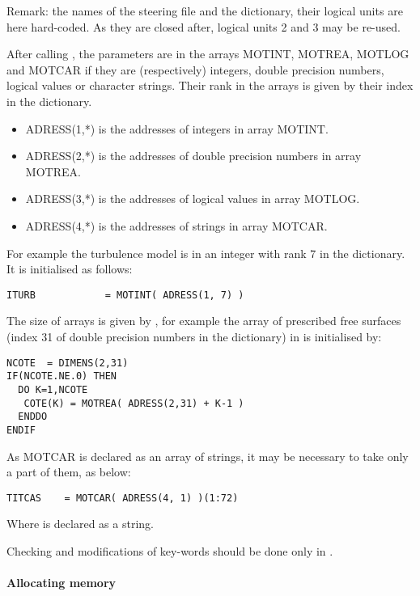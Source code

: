Remark: the names of the steering file and the dictionary, their logical units
are here hard-coded. As they are closed after, logical units 2 and 3 may be
re-used.

After calling , the parameters are in the arrays MOTINT,
MOTREA, MOTLOG and MOTCAR if they are (respectively) integers, double precision
numbers, logical values or character strings. Their rank in the arrays is given
by their index in the dictionary.

\begin{itemize}
  \item ADRESS(1,*) is the addresses of integers in array MOTINT.
  \item ADRESS(2,*) is the addresses of double precision numbers in array
    MOTREA.
  \item ADRESS(3,*) is the addresses of logical values in array MOTLOG.
  \item ADRESS(4,*) is the addresses of strings in array MOTCAR.
\end{itemize}

For example the turbulence model is in  an integer with rank 7 in
the dictionary. It is initialised as follows:
\begin{lstlisting}[language=TelFortran]
ITURB            = MOTINT( ADRESS(1, 7) )
\end{lstlisting}

The size of arrays is given by , for example the array of
prescribed free surfaces (index 31 of double precision  numbers in the
dictionary) in  is initialised by:
\begin{lstlisting}[language=TelFortran]
NCOTE  = DIMENS(2,31)
IF(NCOTE.NE.0) THEN
  DO K=1,NCOTE
   COTE(K) = MOTREA( ADRESS(2,31) + K-1 )
  ENDDO
ENDIF
\end{lstlisting}

As MOTCAR is declared as an array of  strings, it
may be necessary to take only a part of them, as below:
\begin{lstlisting}[language=TelFortran]
TITCAS    = MOTCAR( ADRESS(4, 1) )(1:72)
\end{lstlisting}

Where  is declared as a  string.

Checking and modifications of key-words should be done only in .

\paragraph{Allocating memory}

